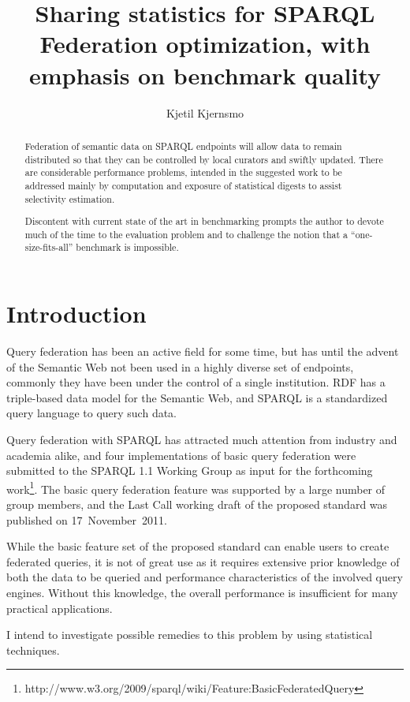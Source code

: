\documentclass{llncs}
\title{Sharing statistics for SPARQL Federation optimization, with
  emphasis on benchmark quality}
\author{Kjetil Kjernsmo\inst{1}}
\institute{Department of Informatics,
Postboks 1080 Blindern,
0316 Oslo, Norway
\email{kjekje@ifi.uio.no}}
\begin{document}
\maketitle



\begin{abstract}
  Federation of semantic data on SPARQL endpoints will allow data to
  remain distributed so that they can be controlled by local curators
  and swiftly updated. There are considerable performance problems,
  intended in the suggested work to be addressed mainly by computation
  and exposure of statistical digests to assist selectivity
  estimation.

  Discontent with current state of the art in benchmarking prompts the
  author to devote much of the time to the evaluation problem and to
  challenge the notion that a ``one-size-fits-all'' benchmark is
  impossible.
\end{abstract}

\section{Introduction}

Query federation has been an active field for some time, but has until
the advent of the Semantic Web not been used in a highly diverse set
of endpoints, commonly they have been under the control of a single
institution. RDF has a triple-based data model for the Semantic Web,
and SPARQL is a standardized query language to query such data.

Query federation with SPARQL has attracted much attention
from industry and academia alike, and four implementations of basic
query federation were submitted to the SPARQL 1.1 Working Group as
input for the forthcoming
work\footnote{http://www.w3.org/2009/sparql/wiki/Feature:BasicFederatedQuery}. 
The basic query federation feature was
supported by a large number of group members, and the Last Call working
draft of the proposed standard was published on 17~November~2011.

While the basic feature set of the proposed standard can enable users
to create federated queries, it is not of great use as it requires
extensive prior knowledge of both the data to be queried and
performance characteristics of the involved query engines. Without
this knowledge, the overall performance is insufficient for many
practical applications.

I intend to investigate possible remedies to this problem by using
statistical techniques. 
\end{document}
